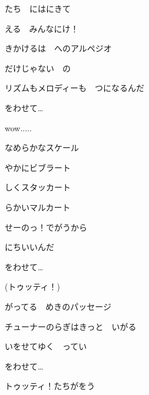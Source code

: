 \documentclass[14pt]{extreport}
\begin{document}
{  たち　にはにきて
  \jisho{}

  える　みんなにけ！
  \jisho{}

\item
  きかけるは　へのアルペジオ
  \jisho{}

  だけじゃない　の
  \jisho{}

  リズムもメロディーも　つになるんだ
  \jisho{}

  をわせて…
  \jisho{}

\item
  wow.....

\item
  なめらかなスケール
  \jisho{}

  やかにビブラート
  \jisho{}

  しくスタッカート
  \jisho{}

  らかいマルカート
  \jisho{}

  せーのっ！でがうから
  \jisho{}

  にちいいんだ
  \jisho{}

  をわせて…
  \jisho{}

\item
  (トゥッティ！)
  \jisho{}

\item
  がってる　めきのパッセージ
  \jisho{}

  チューナーのらぎはきっと　いがる
  \jisho{}

  いをせてゆく　ってい
  \jisho{}

  をわせて…
  \jisho{}

  トゥッティ！たちがをう
  \jisho{}

}
\end{document}
